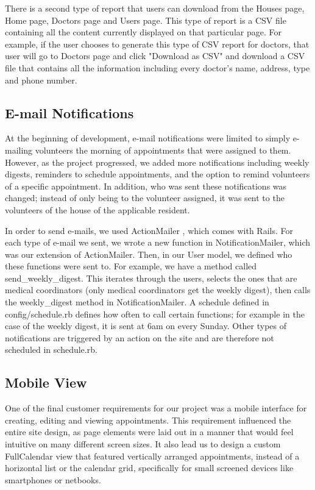\documentclass{sig-alternate}
\begin{document}
There is a second type of report that users can download from the Houses page, Home page, Doctors page and Users page. This type of report is a CSV file containing all the content currently displayed on that particular page. For example, if the user chooses to generate this type of CSV report for doctors, that user will go to Doctors page and click "Download as CSV" and download a CSV file that contains all the information including every doctor's name, address, type and phone number. 

\subsection{E-mail Notifications}
At the beginning of development, e-mail notifications were limited to simply e-mailing volunteers the morning of appointments that were assigned to them. However, as the project progressed, we added more notifications including weekly digests, reminders to schedule appointments, and the option to remind volunteers of a specific appointment. In addition, who was sent these notifications was changed; instead of only being to the volunteer assigned, it was sent to the volunteers of the house of the applicable resident.

In order to send e-mails, we used ActionMailer \cite{actionmailer}, which comes with Rails. For each type of e-mail we sent, we wrote a new function in NotificationMailer, which was our extension of ActionMailer. Then, in our User model, we defined who these functions were sent to. For example, we have a method called send\_weekly\_digest.  This iterates through the users, selects the ones that are medical coordinators (only medical coordinators get the weekly digest), then calls the weekly\_digest method in NotificationMailer. A schedule defined in config/schedule.rb defines how often to call certain functions; for example in the case of the weekly digest, it is sent at 6am on every Sunday. Other types of notifications are triggered by an action on the site and are therefore not scheduled in schedule.rb. 

\subsection{Mobile View}
One of the final customer requirements for our project was a mobile interface for creating, editing and viewing appointments. This requirement influenced the entire site design, as page elements were laid out in a manner that would feel intuitive on many different screen sizes. It also lead us to design a custom FullCalendar view that featured vertically arranged appointments, instead of a horizontal list or the calendar grid, specifically for small screened devices like smartphones or netbooks.
\end{document}
